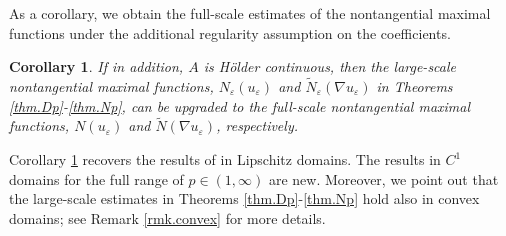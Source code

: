 \documentclass[reqno,12pt]{amsart} %
\newtheorem{corollary}[theorem]{Corollary}
\theoremstyle{definition}
\theoremstyle{remark}
\numberwithin{equation}{section}
\newcommand{\e}{\varepsilon}
\newcommand{\jz}[1]{\textcolor{red}{#1}}
\begin{document}
As a corollary, we obtain the full-scale estimates of the nontangential maximal functions under the additional regularity assumption on the coefficients.
\begin{corollary}\label{coro.fullscale}
    If in addition, $A$ is  H\"{o}lder continuous, then the large-scale nontangential maximal functions, $N_\e(u_\e)$ and $\widetilde{N}_\e(\nabla u_\e)$ in Theorems \ref{thm.Dp}-\ref{thm.Np}, can be upgraded to the full-scale nontangential maximal functions, $N(u_\e)$ and $\widetilde{N}(\nabla u_\e)$, respectively.
\end{corollary}

Corollary \ref{coro.fullscale} recovers the results of \cite{KS11} in Lipschitz domains. The results in $C^1$ domains for the full range of $p\in (1,\infty)$ are new. Moreover, we point out that the large-scale estimates in Theorems \ref{thm.Dp}-\ref{thm.Np} hold also in convex domains; see Remark \ref{rmk.convex} for more details.



\end{document}
